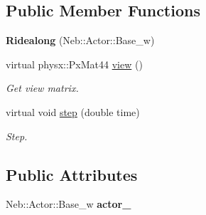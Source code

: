 \subsection*{\-Public \-Member \-Functions}
\begin{DoxyCompactItemize}
\item 
\hypertarget{classNeb_1_1Camera_1_1View_1_1Ridealong_aaf5c6034735477249451271b7f0b348a}{{\bfseries \-Ridealong} (\-Neb\-::\-Actor\-::\-Base\-\_\-w)}\label{classNeb_1_1Camera_1_1View_1_1Ridealong_aaf5c6034735477249451271b7f0b348a}

\item 
\hypertarget{classNeb_1_1Camera_1_1View_1_1Ridealong_a2e5fe6754e72c5ca4fe7658beafce459}{virtual physx\-::\-Px\-Mat44 \hyperlink{classNeb_1_1Camera_1_1View_1_1Ridealong_a2e5fe6754e72c5ca4fe7658beafce459}{view} ()}\label{classNeb_1_1Camera_1_1View_1_1Ridealong_a2e5fe6754e72c5ca4fe7658beafce459}

\begin{DoxyCompactList}\small\item\em \-Get view matrix. \end{DoxyCompactList}\item 
virtual void \hyperlink{classNeb_1_1Camera_1_1View_1_1Ridealong_a11898b9a6acd7ca864c0a32f12ec6e12}{step} (double time)
\begin{DoxyCompactList}\small\item\em \-Step. \end{DoxyCompactList}\end{DoxyCompactItemize}
\subsection*{\-Public \-Attributes}
\begin{DoxyCompactItemize}
\item 
\hypertarget{classNeb_1_1Camera_1_1View_1_1Ridealong_a6de6424f683789941305dddd6fc07e7c}{\-Neb\-::\-Actor\-::\-Base\-\_\-w {\bfseries actor\-\_\-}}\label{classNeb_1_1Camera_1_1View_1_1Ridealong_a6de6424f683789941305dddd6fc07e7c}

\end{DoxyCompactItemize}


